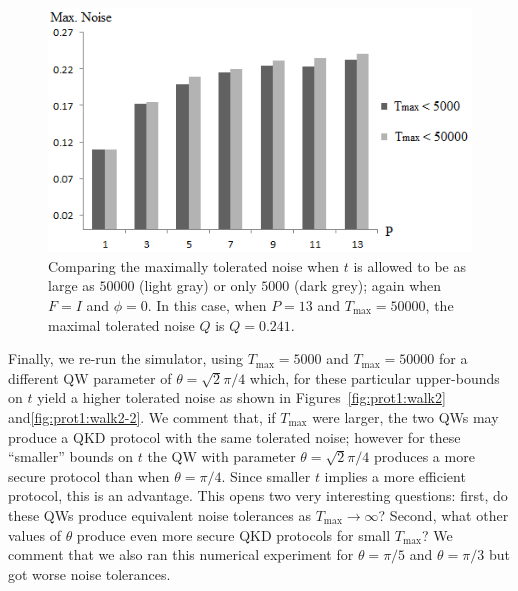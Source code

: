 \begin{figure}[h!]
  \centering
  \includegraphics[scale=0.60]{maxNoiseBigT.png}
\caption{Comparing the maximally tolerated noise when $t$ is allowed to be as large as $50000$ (light gray) or only $5000$ (dark grey); again when $F = I$ and $\phi = 0$.  In this case, when $P=13$ and $T_{\max} = 50000$, the maximal tolerated noise $Q$ is $Q = 0.241$.}\label{fig:prot1:maxnoise2}
\end{figure}

Finally, we re-run the simulator, using $T_{\max} = 5000$ and $T_{\max} = 50000$ for a different QW parameter of $\theta = \sqrt{2}\pi/4$ which, for these particular upper-bounds on $t$ yield a higher tolerated noise as shown in Figures~\ref{fig:prot1:walk2} and\ref{fig:prot1:walk2-2}.  
We comment that, if $T_{\max}$ were larger, the two QWs may produce a QKD protocol with the same tolerated noise; however for these ``smaller'' bounds on $t$ the QW with parameter $\theta = \sqrt{2}\pi/4$ produces a more secure protocol than when $\theta = \pi/4$.  Since smaller $t$ implies a more efficient protocol, this is an advantage.  This opens two very interesting questions: first, do these QWs produce equivalent noise tolerances as $T_{\max}\rightarrow \infty$? Second, what other values of $\theta$ produce even more secure QKD protocols for small $T_{\max}$?  We comment that we also ran this numerical experiment for $\theta = \pi/5$ and $\theta = \pi/3$ but got worse noise tolerances.

